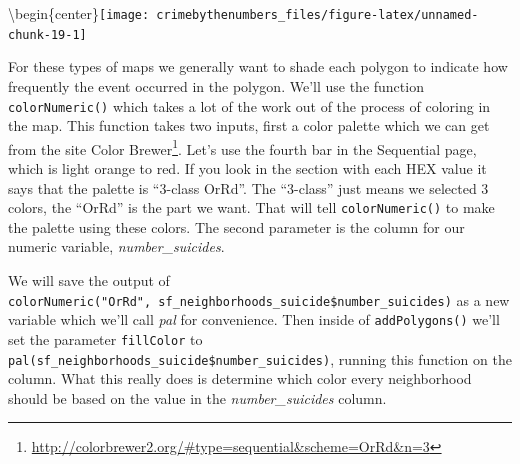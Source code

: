 \documentclass[
]{krantz}
\makeatletter
\newenvironment{Shaded}{\begin{snugshade}}{\end{snugshade}}
\newcommand{\AttributeTok}[1]{\textcolor[rgb]{0.61,0.61,0.61}{#1}}
\newcommand{\DecValTok}[1]{\textcolor[rgb]{0.06,0.06,0.06}{#1}}
\newcommand{\FunctionTok}[1]{\textcolor[rgb]{0,0,0}{#1}}
\newcommand{\NormalTok}[1]{#1}
\newcommand{\OtherTok}[1]{\textcolor[rgb]{0.37,0.37,0.37}{#1}}
\newcommand{\SpecialCharTok}[1]{\textcolor[rgb]{0,0,0}{#1}}
\newcommand{\StringTok}[1]{\textcolor[rgb]{0.5,0.5,0.5}{#1}}
\renewcommand{\href}[2]{#2\footnote{\url{#1}}}
\newenvironment{kframe}{%
\medskip{}
\setlength{\fboxsep}{.8em}
 \def\at@end@of@kframe{}%
 \ifinner\ifhmode%
  \def\at@end@of@kframe{\end{minipage}}%
  \begin{minipage}{\columnwidth}%
 \fi\fi%
 \def\FrameCommand##1{\hskip\@totalleftmargin \hskip-\fboxsep
 \colorbox{shadecolor}{##1}\hskip-\fboxsep
     \hskip-\linewidth \hskip-\@totalleftmargin \hskip\columnwidth}%
 \MakeFramed {\advance\hsize-\width
   \@totalleftmargin\z@ \linewidth\hsize
   \@setminipage}}%
 {\par\unskip\endMakeFramed%
 \at@end@of@kframe}
\renewenvironment{Shaded}{\begin{kframe}}{\end{kframe}}
\makeatother
\begin{document}
\textbackslash begin\{center\}\texttt{[image: crimebythenumbers\_files/figure-latex/unnamed-chunk-19-1]}

For these types of maps we generally want to shade each polygon to indicate how frequently the event occurred in the polygon. We'll use the function \texttt{colorNumeric()} which takes a lot of the work out of the process of coloring in the map. This function takes two inputs, first a color palette which we can get from the site \href{http://colorbrewer2.org/\#type=sequential\&scheme=OrRd\&n=3}{Color Brewer}. Let's use the fourth bar in the Sequential page, which is light orange to red. If you look in the section with each HEX value it says that the palette is ``3-class OrRd''. The ``3-class'' just means we selected 3 colors, the ``OrRd'' is the part we want. That will tell \texttt{colorNumeric()} to make the palette using these colors. The second parameter is the column for our numeric variable, \emph{number\_suicides}.

We will save the output of \texttt{colorNumeric("OrRd",\ sf\_neighborhoods\_suicide\$number\_suicides)} as a new variable which we'll call \emph{pal} for convenience. Then inside of \texttt{addPolygons()} we'll set the parameter \texttt{fillColor} to \texttt{pal(sf\_neighborhoods\_suicide\$number\_suicides)}, running this function on the column. What this really does is determine which color every neighborhood should be based on the value in the \emph{number\_suicides} column.

\begin{Shaded}
\end{Shaded}
\end{document}
